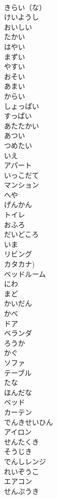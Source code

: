 \documentclass[8pt]{extreport}
\begin{document}
\begin{CJK}{UTF8}{min}
\\	きらい（な）	
\\	けいようし	
\\	おいしい	
\\	たかい	
\\	はやい	
\\	まずい	
\\	やすい	
\\	おそい	
\\	あまい	
\\	からい	
\\	しょっぱい	
\\	すっぱい	
\\	あたたかい	
\\	あつい	
\\	つめたい	
\\	いえ	
\\	アパート	
\\	いっこだて	
\\	マンション	
\\	へや	
\\	げんかん	
\\	トイレ	
\\	おふろ	
\\	だいどころ	
\\	いま	
\\	リビング	
\\	カタカナ)
\\	ベッドルーム	
\\	にわ	
\\	まど	
\\	かいだん	
\\	かべ	
\\	ドア	
\\	ベランダ	
\\	ろうか	
\\	かぐ	
\\	ソファ	
\\	テーブル	
\\	たな	
\\	ほんだな	
\\	ベッド	
\\	カーテン	
\\	でんきせいひん	
\\	アイロン	
\\	せんたくき	
\\	そうじき	
\\	でんしレンジ	
\\	れいぞうこ	
\\	エアコン	
\\	せんぷうき	

\end{CJK}
\end{document}
